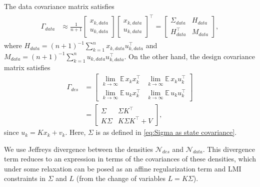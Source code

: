 \documentclass[letterpaper, 10 pt, conference]{ieeeconf}
\newcommand{\E}{\mathbb{E\,}}
\begin{document}
The data covariance matrix satisfies
\begin{align}
\begin{aligned} \label{eq:Gamma data def}
    \Gamma_{data}&\approx \frac{1}{n+1} 
    \begin{bmatrix}
        x_{k,data}\\
        u_{k,data}
    \end{bmatrix}
    \begin{bmatrix}
        x_{k,data}\\
        u_{k,data}
    \end{bmatrix} ^\top = 
    \begin{bmatrix}
         \Sigma_{data} &  H_{data}\\
         H_{data}^\top &  M_{data}
    \end{bmatrix},
\end{aligned}
\end{align}
where $H_{data} = (n+1)^{-1} \sum_{k=1}^n x_{k,data} u_{k,data}^\top$ and $M_{data} = (n+1)^{-1} \sum_{k=1}^n u_{k,data} u_{k,data}^\top$. On the other hand, the design covariance matrix satisfies
\begin{align} \label{eq:design covariance}
    \Gamma_{des} &= 
    \begin{bmatrix}
        \lim_{k \to \infty} \E x_k x_k^\top & \lim_{k \to \infty} \E x_k u_k^\top \\
        \lim_{k \to \infty} \E  u_k x_k^\top & \lim_{k \to \infty} \E  u_k u_k^\top
    \end{bmatrix}\nonumber\\
    &= 
    \begin{bmatrix}
        \Sigma & \Sigma K^\top \\
        K\Sigma & K\Sigma K^\top + V
    \end{bmatrix},
\end{align}
since $u_k = K x_k + v_k$. Here, $\Sigma$ is as defined in \eqref{eq:Sigma as state covariance}. 

 We use Jeffreys divergence between the densities $ \mathcal{N}_{des}$ and $ \mathcal{N}_{data}$. This divergence term reduces to an expression in terms of the covariances of these densities, which under some relaxation can be posed as an affine regularization term and LMI constraints in $\Sigma$ and $L$ (from the change of variables $L=K \Sigma$).
\end{document}
